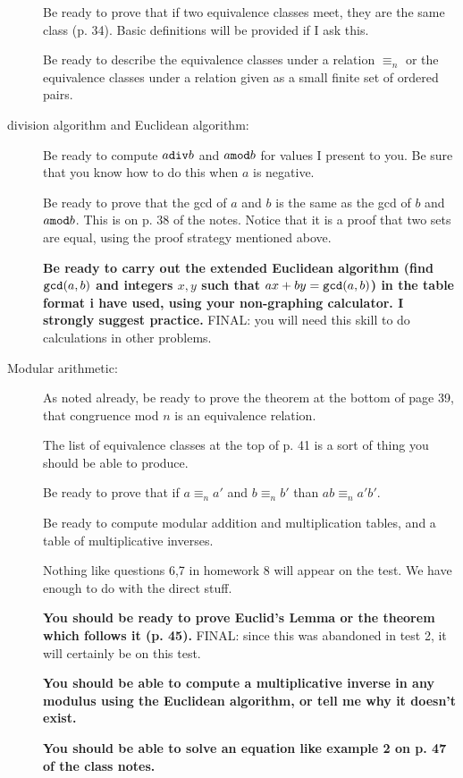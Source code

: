 \documentclass[12pt]{article}
\begin{document}
\begin{description}
Be ready to prove that if two equivalence classes meet, they are the same class (p. 34).  Basic definitions will be provided if I ask this.

Be ready to describe the equivalence classes under a relation $\equiv_n$ or the equivalence classes under a relation given as a small finite set of ordered pairs.

\item[division algorithm and Euclidean algorithm:]

Be ready to compute $a {\tt div} b$ and $a {\tt mod} b$ for values I present to you.  Be sure that you know how to do this when $a$ is negative.

Be ready to prove that the gcd of $a$ and $b$ is the same as the gcd of $b$ and $a {\tt mod} b$.  This is on p.  38 of the notes.  Notice that it is a proof that two sets are equal, using the proof strategy mentioned above.

{\bf Be ready to carry out the extended Euclidean algorithm (find ${\tt gcd}(a,b)$ and integers $x, y$ such that
$ax+by = {\tt gcd}(a,b)$) in the table format i have used, using your non-graphing calculator.  I strongly suggest practice.}  FINAL:  you will need this skill to do calculations in other problems.

\item[Modular arithmetic:]

As noted already, be ready to prove the theorem at the bottom of page 39, that congruence mod $n$ is an equivalence relation.

The list of equivalence classes at the top of p. 41 is a sort of thing you should be able to produce.

Be ready to prove that if $a \equiv_n a'$ and $b \equiv_n b'$ than $ab \equiv_n a'b'$.

Be ready to compute modular addition and multiplication tables, and a table of multiplicative inverses.

Nothing like questions 6,7 in homework 8 will appear on the test.  We have enough to do with the direct stuff.

{\bf You should be ready to prove Euclid's Lemma or the theorem which follows it (p. 45).}  FINAL:  since this was abandoned in test 2, it will certainly be on this test.

{\bf You should be able to compute a multiplicative inverse in any modulus using the Euclidean algorithm, or tell me why it doesn't exist.}

{\bf You should be able to solve an equation like example 2 on p. 47 of the class notes.}


\end{description}
\end{document}

